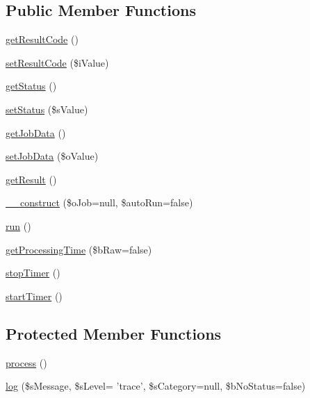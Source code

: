 \subsection*{Public Member Functions}
\begin{DoxyCompactItemize}
\item 
\hyperlink{classCPSJobProcess_a43878aef3c85b396a28e4b8e4fce0fc2}{getResultCode} ()
\item 
\hyperlink{classCPSJobProcess_af1f91fdb702f9b13e5869aed94fa61ae}{setResultCode} (\$iValue)
\item 
\hyperlink{classCPSJobProcess_a9d21636071f529e2154051d3ea6e5921}{getStatus} ()
\item 
\hyperlink{classCPSJobProcess_aa6fdfc32edc157649619c5c549f7d651}{setStatus} (\$sValue)
\item 
\hyperlink{classCPSJobProcess_a8ec5d045b7c39a3712a14426a5fb9219}{getJobData} ()
\item 
\hyperlink{classCPSJobProcess_abafd9c8b01d9f53afd70c9746e2d8797}{setJobData} (\$oValue)
\item 
\hyperlink{classCPSJobProcess_ae077eb8a032a325ceb939bfabfa5f472}{getResult} ()
\item 
\hyperlink{classCPSJobProcess_af4e85e6b3dfe0f1383d7171ea7ddcf54}{\_\-\_\-construct} (\$oJob=null, \$autoRun=false)
\item 
\hyperlink{classCPSJobProcess_afb0fafe7e02a3ae1993c01c19fad2bae}{run} ()
\item 
\hyperlink{classCPSJobProcess_afe99d678d7ad80f340b9642ce1c2cd50}{getProcessingTime} (\$bRaw=false)
\item 
\hyperlink{classCPSJobProcess_a013c0d9ca789c13c56b13cb96d26174a}{stopTimer} ()
\item 
\hyperlink{classCPSJobProcess_a3f20c6773be010b2744fb3451651746c}{startTimer} ()
\end{DoxyCompactItemize}
\subsection*{Protected Member Functions}
\begin{DoxyCompactItemize}
\item 
\hyperlink{classCPSJobProcess_a7d4ad4038b036a67eece619e6f88c89e}{process} ()
\item 
\hyperlink{classCPSJobProcess_a64cd9d30098246574f7ea72073bf79e5}{log} (\$sMessage, \$sLevel= 'trace', \$sCategory=null, \$bNoStatus=false)
\end{DoxyCompactItemize}
